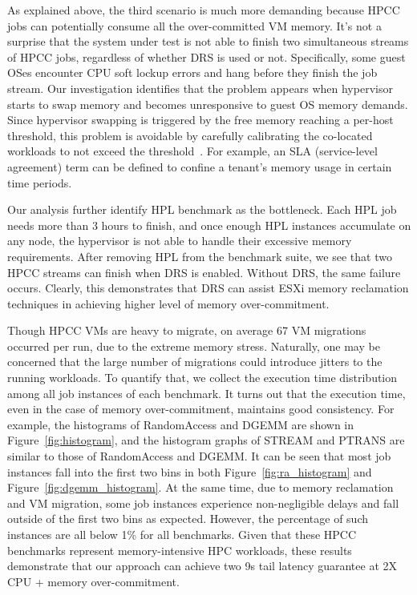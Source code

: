 As explained above, the third scenario is much more demanding because HPCC jobs can potentially consume all the over-committed VM memory. It's not a surprise that the system under test is not able to finish two simultaneous streams of HPCC jobs, regardless of whether DRS is used or not. Specifically, some guest OSes encounter CPU soft lockup errors and hang before they finish the job stream. Our investigation identifies that the problem appears when hypervisor starts to swap memory and becomes unresponsive to guest OS memory demands. Since hypervisor swapping 
is triggered by the free memory reaching a per-host threshold, this problem is avoidable by carefully calibrating the co-located workloads to not exceed the threshold~\cite{banerjee2013memory}. For example, an SLA (service-level agreement) term can be defined to confine a tenant's memory usage in certain time periods. 

Our analysis further identify HPL benchmark as the bottleneck. Each HPL job needs more than 3 hours to finish, and once enough HPL instances accumulate on any node, the hypervisor is not able to handle their excessive memory requirements. After removing HPL from the benchmark suite, we see that two HPCC streams can finish when DRS is enabled. Without DRS, the same failure occurs. Clearly, this demonstrates that DRS can assist ESXi memory reclamation techniques in achieving higher level of memory over-commitment. 

Though HPCC VMs are heavy to migrate, on average 67 VM migrations occurred per run, due to the extreme memory stress. Naturally, one may be concerned that the large number of migrations could introduce jitters to the running workloads. To quantify that, we collect the execution time distribution among all job instances of each benchmark. It turns out that the execution time, even in the case of memory over-commitment, maintains good consistency. For example, the histograms of RandomAccess and DGEMM are shown in Figure~\ref{fig:histogram}, and the histogram graphs of STREAM and PTRANS are similar to those of RandomAccess and DGEMM. It can be seen that most job instances fall into the first two bins in both Figure~\ref{fig:ra_histogram} and Figure~\ref{fig:dgemm_histogram}. At the same time, due to memory reclamation and VM migration, some job instances experience non-negligible delays and fall outside of the first two bins as expected. However, the percentage of such instances are all below 1\% for all benchmarks. Given that these HPCC benchmarks represent memory-intensive HPC workloads, these results demonstrate that our approach can achieve two 9s tail latency guarantee at 2X CPU + memory over-commitment. 


